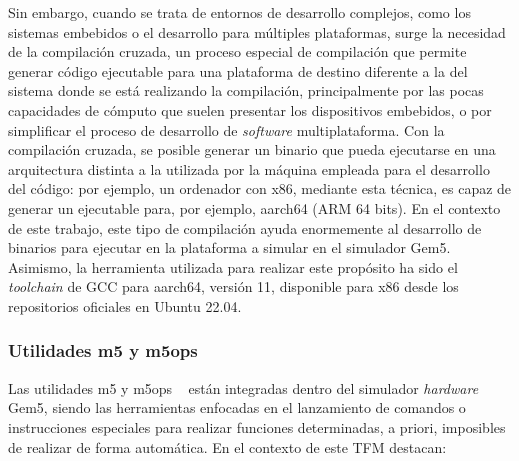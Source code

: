   Sin embargo, cuando se trata de entornos de desarrollo complejos, como los sistemas embebidos o el desarrollo para múltiples plataformas, surge la necesidad de la compilación cruzada, un proceso especial de compilación que permite generar código ejecutable para una plataforma de destino diferente a la del sistema donde se está realizando la compilación, principalmente por las pocas capacidades de cómputo que suelen presentar los dispositivos embebidos, o por simplificar el proceso de desarrollo de \textit{software} multiplataforma. Con la compilación cruzada, se posible generar un binario que pueda ejecutarse en una arquitectura distinta a la utilizada por la máquina empleada para el desarrollo del código: por ejemplo, un ordenador con x86, mediante esta técnica, es capaz de generar un ejecutable para, por ejemplo, aarch64 (\ac{ARM} 64 bits). En el contexto de este trabajo, este tipo de compilación ayuda enormemente al desarrollo de binarios para ejecutar en la plataforma a simular en el simulador Gem5. Asimismo, la herramienta utilizada para realizar este propósito ha sido el \textit{toolchain} de \ac{GCC} para aarch64, versión 11, disponible para x86 desde los repositorios oficiales en Ubuntu 22.04. 

\subsubsection{Utilidades m5 y m5ops}
\label{sec:configM5ops}

Las utilidades m5 y m5ops ~\cite{m5ops-documentacion} están integradas dentro del simulador \textit{hardware} Gem5, siendo las herramientas enfocadas en el lanzamiento de comandos o instrucciones especiales para realizar funciones determinadas, a priori, imposibles de realizar de forma automática. En el contexto de este \ac{TFM} destacan:

